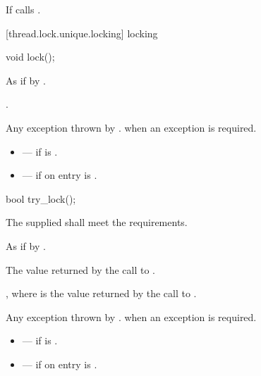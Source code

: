 \begin{itemdescr}
\pnum\effects If  calls .
\end{itemdescr}

[thread.lock.unique.locking]{ locking}

%
\begin{itemdecl}
void lock();
\end{itemdecl}

\begin{itemdescr}
\pnum
\effects As if by .

\pnum
\postconditions {}.

\pnum
\throws
Any exception thrown by .  when an exception
is required.

\pnum
\errors
\begin{itemize}
\item {} --- if  is .
\item {} --- if on entry 
is .
\end{itemize}
\end{itemdescr}

%
\begin{itemdecl}
bool try_lock();
\end{itemdecl}

\begin{itemdescr}
\pnum
\requires The supplied  shall meet the 
requirements.

\pnum
\effects As if by .

\pnum\returns The value returned by the call to .

\pnum
\postconditions {}, where  is the value returned by
the call to .

\pnum
\throws
Any exception thrown by .  when an exception
is required.

\pnum
\errors
\begin{itemize}
\item {} --- if  is .
\item {} --- if on entry 
is .
\end{itemize}
\end{itemdescr}

